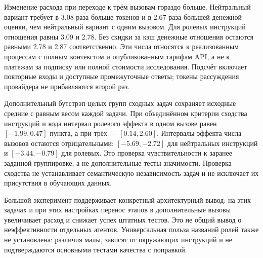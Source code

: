 Изменение расхода при переходе к трём вызовам гораздо больше. Нейтральный вариант требует в 3.08 раза больше токенов и в 2.67 раза большей денежной оценки, чем нейтральный вариант с одним вызовом. Для ролевых инструкций отношения равны 3.09 и 2.78. Без скидки за кэш денежные отношения остаются равными 2.78 и 2.87 соответственно. Эти числа относятся к реализованным процессам с полным контекстом и опубликованным тарифам API, а не к платежам за подписку или полной стоимости исследования. Подсчёт включает повторные входы и доступные промежуточные ответы; токены рассуждения провайдера не прибавляются второй раз.

Дополнительный бутстрэп целых групп сходных задач сохраняет исходные средние с равным весом каждой задачи. При объединённом критерии сходства инструкций и кода интервал ролевого эффекта в одном вызове равен $[-1.99,0.47]$ пункта, а при трёх --- $[0.14,2.60]$. Интервалы эффекта числа вызовов остаются отрицательными: $[-5.69,-2.72]$ для нейтральных инструкций и $[-3.44,-0.79]$ для ролевых. Это проверка чувствительности к заранее заданной группировке, а не дополнительные тесты значимости. Проверка сходства не устанавливает семантическую независимость задач и не исключает их присутствия в обучающих данных.

Большой эксперимент поддерживает конкретный архитектурный вывод: на этих задачах и при этих настройках перенос этапов в дополнительные вызовы увеличивает расход и снижает успех штатных тестов. Это не общий вывод о неэффективности отдельных агентов. Универсальная польза названий ролей также не установлена: различия малы, зависят от окружающих инструкций и не подтверждаются основными тестами качества с поправкой.
